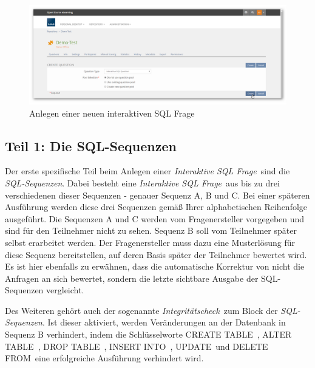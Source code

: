     \begin{figure}[H]
        \begin{center}
            \includegraphics[page=1, width=0.7\paperwidth, trim=4 4 4 4, clip]{fig/Create-Question.png} 
            \caption{Anlegen einer neuen interaktiven SQL Frage}
            \label{fig:create-question}
        \end{center}
    \end{figure}
    
\subsection{Teil 1: Die SQL-Sequenzen}

    Der erste  spezifische Teil beim Anlegen einer \glqq\textit{Interaktive SQL Frage}\grqq\ sind die \glqq\textit{SQL-Sequenzen}\grqq . Dabei besteht eine \glqq\textit{Interaktive SQL Frage}\grqq\ aus bis zu drei verschiedenen dieser Sequenzen - genauer Sequenz A, B und C. Bei einer späteren Ausführung werden diese drei Sequenzen gemäß Ihrer alphabetischen Reihenfolge ausgeführt. Die Sequenzen A und C werden vom Fragenersteller vorgegeben und sind für den Teilnehmer nicht zu sehen. Sequenz B soll vom Teilnehmer später selbst erarbeitet werden. Der Fragenersteller muss dazu eine Musterlösung für diese Sequenz bereitstellen, auf deren Basis später der Teilnehmer bewertet wird. Es ist hier ebenfalls zu erwähnen, dass die automatische Korrektur von  nicht die Anfragen an sich bewertet, sondern die letzte sichtbare Ausgabe der SQL-Sequenzen vergleicht.
    
    Des Weiteren gehört auch der sogenannte \glqq\textit{Integritätscheck}\grqq\ zum Block der \glqq\textit{SQL-Sequenzen}\grqq . Ist dieser aktiviert, werden Veränderungen an der Datenbank in Sequenz B verhindert, indem die Schlüsselworte \glqq CREATE TABLE\grqq\ , \glqq ALTER TABLE\grqq\ , \glqq DROP TABLE\grqq\ , \glqq INSERT INTO\grqq\ , \glqq UPDATE\grqq\  und \glqq DELETE FROM\grqq\ eine erfolgreiche Ausführung verhindert wird.
    

